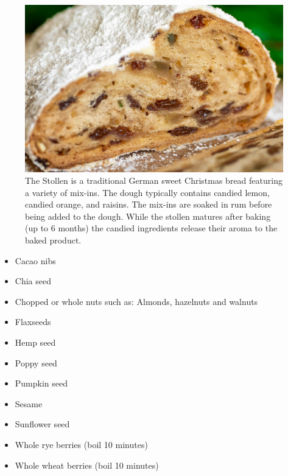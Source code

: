 \begin{figure}[htb!]
  \includegraphics[width=\textwidth]{stollen-close-up}
  \caption[Stollen closeup]{The Stollen is a traditional German sweet Christmas
    bread featuring a variety of mix-ins. The dough typically contains candied lemon,
    candied orange, and raisins. The mix-ins are soaked in rum before being added to
    the dough. While the stollen matures after baking (up to \num{6} months) the candied ingredients release
    their aroma to the baked product.}%
\end{figure}

\begin{itemize}
  \item Cacao nibs
  \item Chia seed
  \item Chopped or whole nuts such as: Almonds, hazelnuts and walnuts
  \item Flaxseeds
  \item Hemp seed
  \item Poppy seed
  \item Pumpkin seed
  \item Sesame
  \item Sunflower seed
  \item Whole rye berries (boil 10 minutes)
  \item Whole wheat berries (boil 10 minutes)
\end{itemize}



